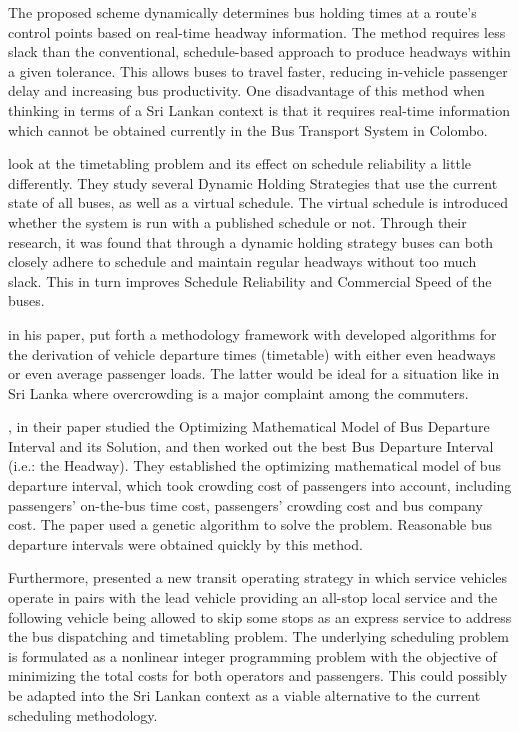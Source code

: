The proposed scheme dynamically determines bus holding times at a route’s control points based on real-time headway information. The method requires less slack than the conventional, schedule-based approach to produce headways within a given tolerance. This allows buses to travel faster, reducing in-vehicle passenger delay and increasing bus productivity. One disadvantage of this method when thinking in terms of a Sri Lankan context is that it requires real-time information which cannot be obtained currently in the Bus Transport System in Colombo.

\cite{Xuan2011} look at the timetabling problem and its effect on schedule reliability a little differently. They study several Dynamic Holding Strategies that use the current state of all buses, as well as a virtual schedule. The virtual schedule is introduced whether the system is run with a 
published schedule or not. Through their research, it was found that through a dynamic holding strategy buses can both closely adhere to schedule and maintain regular headways without too much slack. This in turn improves Schedule Reliability and Commercial Speed of the buses.

\cite{Ceder2009} in his paper, put forth a methodology framework with developed algorithms for the derivation of vehicle departure times (timetable) with either even headways or even average passenger loads. The latter would be ideal for a situation like in Sri Lanka where overcrowding is a major complaint among the commuters.

\cite{Qian2013}, in their paper studied the Optimizing Mathematical Model of Bus Departure Interval and its Solution, and then worked out the best Bus Departure Interval (i.e.: the Headway). They established the optimizing mathematical model of bus departure interval, which took crowding cost of passengers into account, including passengers’ on-the-bus time cost, passengers’ crowding cost and bus company cost. The paper used a genetic algorithm to solve the problem. Reasonable bus departure intervals were obtained quickly by this method.

Furthermore, \cite{Fu2003} presented a new transit operating strategy in which service vehicles operate in pairs with the lead vehicle providing an all-stop local service and the following vehicle being allowed to skip some stops as an express service to address the bus dispatching and timetabling problem. The underlying scheduling problem is formulated as a nonlinear integer programming problem with the objective of minimizing the total costs for both operators and passengers. This could possibly be adapted into the Sri Lankan context as a viable alternative to the current scheduling methodology.

